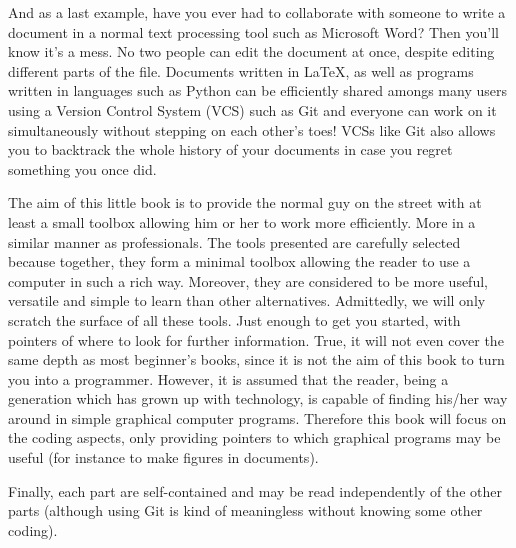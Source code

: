 And as a last example, have you ever had to collaborate with someone to write a document in a normal text processing tool such as Microsoft Word? Then you’ll know it’s a mess. No two people can edit the document at once, despite editing different parts of the file. Documents written in LaTeX, as well as programs written in languages such as Python can be efficiently shared amongs many users using a Version Control System (VCS) such as Git and everyone can work on it simultaneously without stepping on each other’s toes! VCSs like Git also allows you to backtrack the whole history of your documents in case you regret something you once did.

The aim of this little book is to provide the normal guy on the street with at least a small toolbox allowing him or her to work more efficiently. More in a similar manner as professionals. The tools presented are carefully selected because together, they form a minimal toolbox allowing the reader to use a computer in such a rich way. Moreover, they are considered to be more useful, versatile and simple to learn than other alternatives. Admittedly, we will only scratch the surface of all these tools. Just enough to get you started, with pointers of where to look for further information. True, it will not even cover the same depth as most beginner’s books, since it is not the aim of this book to turn you into a programmer. However, it is assumed that the reader, being a generation which has grown up with technology, is capable of finding his/her way around in simple graphical computer programs. Therefore this book will focus on the coding aspects, only providing pointers to which graphical programs may be useful (for instance to make figures in documents).

Finally, each part are self-contained and may be read independently of the other parts (although using Git is kind of meaningless without knowing some other coding).